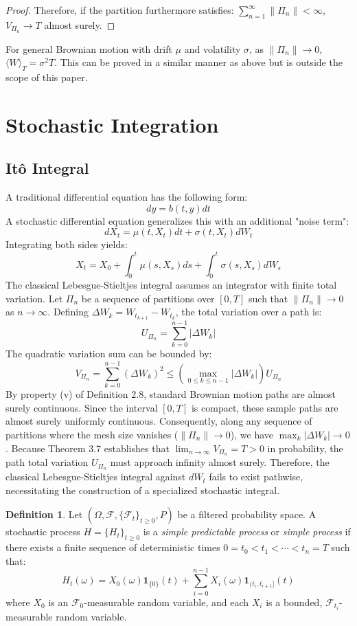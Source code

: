 \documentclass[12pt]{article}
\theoremstyle{definition}
\newtheorem{definition}{Definition}[section]
\theoremstyle{plain}
\theoremstyle{remark}
\begin{document}
\begin{proof}
Therefore, if the partition furthermore satisfies: $\sum_{n=1}^\infty \|\Pi_n\| < \infty$, $V_{\Pi_n} \to T$ almost surely.
\end{proof}

For general Brownian motion with drift $\mu$ and volatility $\sigma$, as $\|\Pi_n\| \to 0$, $\langle W \rangle _T = \sigma^2T$.  This can be proved in a similar manner as above but is outside the scope of this paper.



\section{Stochastic Integration}

\subsection{It\^o Integral}
A traditional differential equation has the following form:
\[
dy = b(t,y)dt
\]
A stochastic differential equation generalizes this with an additional "noise term":
\[
dX_t = \mu(t,X_t)dt + \sigma(t,X_t)dW_t
\]
Integrating both sides yields:
\[
X_t = X_0 + \int_0^t \mu(s,X_s)ds + \int_0^t \sigma(s,X_s)dW_s
\]
The classical Lebesgue-Stieltjes integral assumes an integrator with finite total variation. Let $\Pi_n$ be a sequence of partitions over $[0,T]$ such that $\|\Pi_n\| \to 0$ as $n \to \infty$. Defining $\Delta W_k = W_{t_{k+1}} - W_{t_k}$, the total variation over a path is:
\[
U_{\Pi_n} = \sum_{k=0}^{n-1} |\Delta W_k|
\]
The quadratic variation sum can be bounded by:
\[
V_{\Pi_n} = \sum_{k=0}^{n-1} (\Delta W_k)^2 \leq \left( \max_{0 \leq k \leq n-1} \left| \Delta W_k \right| \right) U_{\Pi_n}
\]
By property (v) of Definition 2.8, standard Brownian motion paths are almost surely continuous. Since the interval $[0,T]$ is compact, these sample paths are almost surely uniformly continuous. Consequently, along any sequence of partitions where the mesh size vanishes ($\|\Pi_n\| \to 0$), we have $\max_k \left| \Delta W_k \right| \to 0$. Because Theorem 3.7 establishes that $\lim_{n \to \infty} V_{\Pi_n} = T > 0$ in probability, the path total variation $U_{\Pi_n}$ must approach infinity almost surely. Therefore, the classical Lebesgue-Stieltjes integral against $dW_t$ fails to exist pathwise, necessitating the construction of a specialized stochastic integral.

\begin{definition}
Let $(\Omega, \mathcal{F}, \{\mathcal{F}_t\}_{t \geq 0}, P) $ be a filtered probability space. A stochastic process $H = \{H_t\}_{t \geq 0}$ is a \textit{simple predictable process} or \textit{simple process} if there exists a finite sequence of deterministic times $0 = t_0 < t_1 < \cdots < t_n = T$ such that:
\[
H_t(\omega) = X_0(\omega) \mathbf{1}_{\{0\}}(t) + \sum_{i=0}^{n-1} X_i(\omega) \mathbf{1}_{(t_i,t_{i+1}]}(t)
\]
where $X_0$ is an $\mathcal{F}_0$-measurable random variable, and each $X_i$ is a bounded, $\mathcal{F}_{t_i}$-measurable random variable.
\end{definition}
\end{document}
